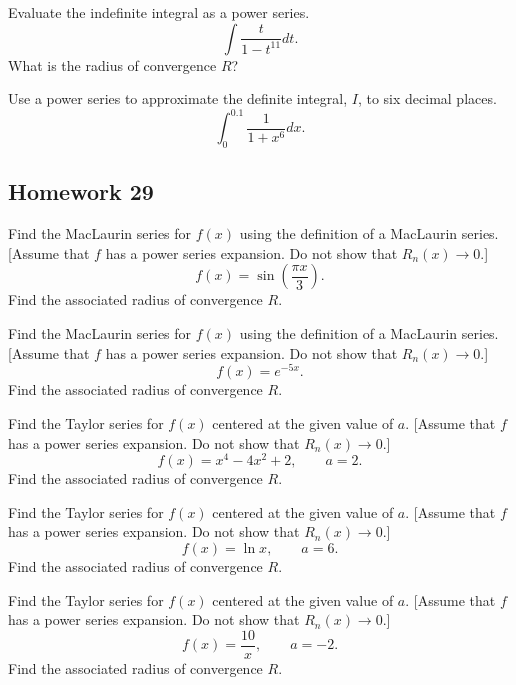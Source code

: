 \begin{problem}[WebAssign HW 28, \# 7]
Evaluate the indefinite integral as a power series.
\[
\int\frac{t}{1-t^{11}}dt.
\]
What is the radius of convergence $R$?
\end{problem}

\begin{problem}[WebAssign HW 28, \# 8]
Use a power series to approximate the definite integral, $I$, to six
decimal places.
\[
\int_0^{0.1}\frac{1}{1+x^6}dx.
\]
\end{problem}

\subsection{Homework 29}
\begin{problem}[WebAssign HW 29, \# 1]
Find the MacLaurin series for $f(x)$ using the definition of a MacLaurin
series. [Assume that $f$ has a power series expansion. Do not show that
$R_n(x)\to 0$.]
\[
f(x)=\sin\left(\frac{\pi x}{3}\right).
\]
Find the associated radius of convergence $R$.
\end{problem}

\begin{problem}[WebAssign HW 29, \# 2]
Find the MacLaurin series for $f(x)$ using the definition of a MacLaurin
series. [Assume that $f$ has a power series expansion. Do not show that
$R_n(x)\to 0$.]
\[
f(x)=e^{-5x}.
\]
Find the associated radius of convergence $R$.
\end{problem}

\begin{problem}[WebAssign HW 29, \# 3]
Find the Taylor series for $f(x)$ centered at the given value of
$a$. [Assume that $f$ has a power series expansion. Do not show that
$R_n(x)\to 0$.]
\[
f(x)=x^4-4x^2+2,\qquad a=2.
\]
Find the associated radius of convergence $R$.
\end{problem}

\begin{problem}[WebAssign HW 29, \# 4]
Find the Taylor series for $f(x)$ centered at the given value of
$a$. [Assume that $f$ has a power series expansion. Do not show that
$R_n(x)\to 0$.]
\[
f(x)=\ln x,\qquad a=6.
\]
Find the associated radius of convergence $R$.
\end{problem}

\begin{problem}[WebAssign HW 29, \# 5]
Find the Taylor series for $f(x)$ centered at the given value of
$a$. [Assume that $f$ has a power series expansion. Do not show that
$R_n(x)\to 0$.]
\[
f(x)=\frac{10}{x},\qquad a=-2.
\]
Find the associated radius of convergence $R$.
\end{problem}

